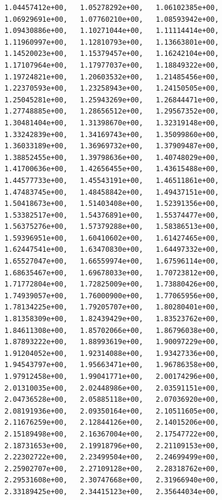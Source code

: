 \documentclass[11pt]{article}
\begin{document}
\begin{verbatim}
         1.04457412e+00,   1.05278292e+00,   1.06102385e+00,
         1.06929691e+00,   1.07760210e+00,   1.08593942e+00,
         1.09430886e+00,   1.10271044e+00,   1.11114414e+00,
         1.11960997e+00,   1.12810793e+00,   1.13663801e+00,
         1.14520023e+00,   1.15379457e+00,   1.16242104e+00,
         1.17107964e+00,   1.17977037e+00,   1.18849322e+00,
         1.19724821e+00,   1.20603532e+00,   1.21485456e+00,
         1.22370593e+00,   1.23258943e+00,   1.24150505e+00,
         1.25045281e+00,   1.25943269e+00,   1.26844471e+00,
         1.27748885e+00,   1.28656512e+00,   1.29567352e+00,
         1.30481404e+00,   1.31398670e+00,   1.32319148e+00,
         1.33242839e+00,   1.34169743e+00,   1.35099860e+00,
         1.36033189e+00,   1.36969732e+00,   1.37909487e+00,
         1.38852455e+00,   1.39798636e+00,   1.40748029e+00,
         1.41700636e+00,   1.42656455e+00,   1.43615488e+00,
         1.44577733e+00,   1.45543191e+00,   1.46511861e+00,
         1.47483745e+00,   1.48458842e+00,   1.49437151e+00,
         1.50418673e+00,   1.51403408e+00,   1.52391356e+00,
         1.53382517e+00,   1.54376891e+00,   1.55374477e+00,
         1.56375276e+00,   1.57379288e+00,   1.58386513e+00,
         1.59396951e+00,   1.60410602e+00,   1.61427465e+00,
         1.62447541e+00,   1.63470830e+00,   1.64497332e+00,
         1.65527047e+00,   1.66559974e+00,   1.67596114e+00,
         1.68635467e+00,   1.69678033e+00,   1.70723812e+00,
         1.71772804e+00,   1.72825009e+00,   1.73880426e+00,
         1.74939057e+00,   1.76000900e+00,   1.77065956e+00,
         1.78134225e+00,   1.79205707e+00,   1.80280401e+00,
         1.81358309e+00,   1.82439429e+00,   1.83523762e+00,
         1.84611308e+00,   1.85702066e+00,   1.86796038e+00,
         1.87893222e+00,   1.88993619e+00,   1.90097229e+00,
         1.91204052e+00,   1.92314088e+00,   1.93427336e+00,
         1.94543797e+00,   1.95663471e+00,   1.96786358e+00,
         1.97912458e+00,   1.99041771e+00,   2.00174296e+00,
         2.01310035e+00,   2.02448986e+00,   2.03591151e+00,
         2.04736528e+00,   2.05885118e+00,   2.07036920e+00,
         2.08191936e+00,   2.09350164e+00,   2.10511605e+00,
         2.11676259e+00,   2.12844126e+00,   2.14015206e+00,
         2.15189498e+00,   2.16367004e+00,   2.17547722e+00,
         2.18731653e+00,   2.19918796e+00,   2.21109153e+00,
         2.22302722e+00,   2.23499504e+00,   2.24699499e+00,
         2.25902707e+00,   2.27109128e+00,   2.28318762e+00,
         2.29531608e+00,   2.30747668e+00,   2.31966940e+00,
         2.33189425e+00,   2.34415123e+00,   2.35644034e+00,

\end{verbatim}
\end{document}
